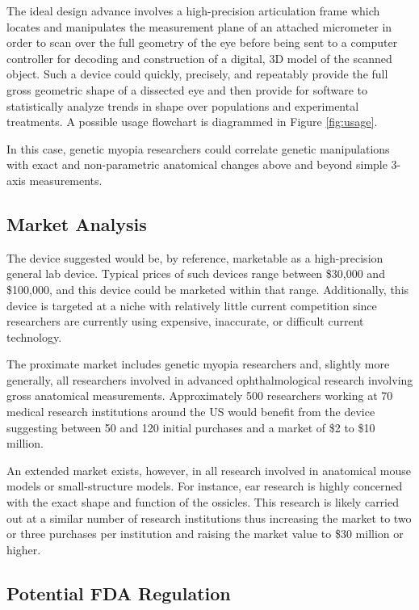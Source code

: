 \documentclass{article}
\begin{document}
The ideal design advance involves a high-precision articulation frame
which locates and manipulates the measurement plane of an attached
micrometer in order to scan over the full geometry of the eye before
being sent to a computer controller for decoding and construction of a
digital, 3D model of the scanned object. Such a device could quickly,
precisely, and repeatably provide the full gross geometric shape of a
dissected eye and then provide for software to statistically analyze
trends in shape over populations and experimental treatments. A possible usage flowchart is diagrammed in Figure \ref{fig:usage}.

In this case, genetic myopia researchers could correlate genetic
manipulations with exact and non-parametric anatomical changes above
and beyond simple 3-axis measurements.

\subsection{Market Analysis}
\label{sec:market-analysis}

The device suggested would be, by reference, marketable as a
high-precision general lab device. Typical prices of such devices range between
\$30,000 and \$100,000, and this device could be marketed within that
range. Additionally, this device is targeted at a niche with
relatively little current competition since researchers are currently using expensive, inaccurate, or difficult current technology.

The proximate market includes genetic myopia researchers and, slightly
more generally, all researchers involved in advanced ophthalmological
research involving gross anatomical measurements. Approximately 500
researchers working at 70 medical research institutions around the US
would benefit from the device suggesting between 50 and 120 initial
purchases and a market of \$2 to \$10 million.

An extended market exists, however, in all research involved in
anatomical mouse models or small-structure models. For instance,
ear research is highly concerned with the exact shape and function of
the ossicles. This research is likely carried out at a similar number
of research institutions thus increasing the market to two or three
purchases per institution and raising the market value to \$30 million
or higher.

\subsection{Potential FDA Regulation}
\label{sec:potent-fda}
\end{document}
